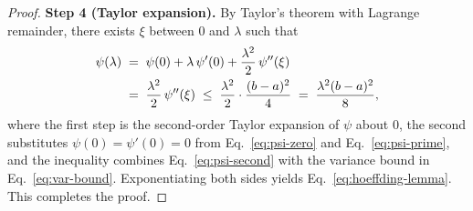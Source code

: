 \begin{proof}
\smallskip\noindent\textbf{Step 4 (Taylor expansion).}
By Taylor's theorem with Lagrange remainder, there exists $\xi$ between $0$ and
$\lambda$ such that
\begin{align}
\psi(\lambda)
&\;=\; \psi(0) + \lambda\,\psi'(0) + \frac{\lambda^2}{2}\,\psi''(\xi) \notag \\
&\;=\; \frac{\lambda^2}{2}\,\psi''(\xi)
   \;\le\; \frac{\lambda^2}{2} \cdot \frac{(b - a)^2}{4}
   \;=\; \frac{\lambda^2 (b - a)^2}{8}, \label{eq:psi-taylor}
\end{align}
where the first step is the second-order Taylor expansion of $\psi$ about $0$,
the second substitutes $\psi(0) = \psi'(0) = 0$ from
Eq.~\eqref{eq:psi-zero} and Eq.~\eqref{eq:psi-prime}, and the inequality combines
Eq.~\eqref{eq:psi-second} with the variance bound in
Eq.~\eqref{eq:var-bound}. Exponentiating both sides yields
Eq.~\eqref{eq:hoeffding-lemma}. This completes the proof.
\end{proof}
